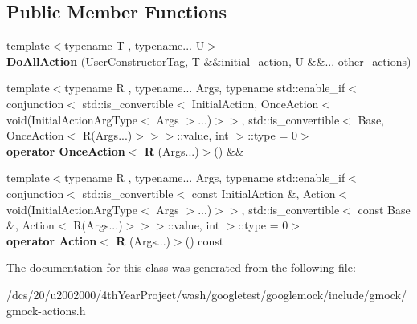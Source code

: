 \subsection*{Public Member Functions}
\begin{DoxyCompactItemize}
\item 
\mbox{\label{classtesting_1_1internal_1_1DoAllAction_3_01InitialAction_00_01OtherActions_8_8_8_01_4_a726288a771d93b49da88125f2499d067}} 
{\footnotesize template$<$typename T , typename... U$>$ }\\{\bfseries Do\+All\+Action} (User\+Constructor\+Tag, T \&\&initial\+\_\+action, U \&\&... other\+\_\+actions)
\item 
\mbox{\label{classtesting_1_1internal_1_1DoAllAction_3_01InitialAction_00_01OtherActions_8_8_8_01_4_a6809411684469fda88690fe29a3ca134}} 
{\footnotesize template$<$typename R , typename... Args, typename std\+::enable\+\_\+if$<$ conjunction$<$ std\+::is\+\_\+convertible$<$ Initial\+Action, Once\+Action$<$ void(\+Initial\+Action\+Arg\+Type$<$ Args $>$...)$>$$>$, std\+::is\+\_\+convertible$<$ Base, Once\+Action$<$ R(\+Args...)$>$$>$$>$\+::value, int $>$\+::type  = 0$>$ }\\{\bfseries operator Once\+Action$<$ R} (Args...)$>$() \&\&
\item 
\mbox{\label{classtesting_1_1internal_1_1DoAllAction_3_01InitialAction_00_01OtherActions_8_8_8_01_4_a2cad7d9ed5d90573d421833482b51744}} 
{\footnotesize template$<$typename R , typename... Args, typename std\+::enable\+\_\+if$<$ conjunction$<$ std\+::is\+\_\+convertible$<$ const Initial\+Action \&, Action$<$ void(\+Initial\+Action\+Arg\+Type$<$ Args $>$...)$>$$>$, std\+::is\+\_\+convertible$<$ const Base \&, Action$<$ R(\+Args...)$>$$>$$>$\+::value, int $>$\+::type  = 0$>$ }\\{\bfseries operator Action$<$ R} (Args...)$>$() const
\end{DoxyCompactItemize}


The documentation for this class was generated from the following file\+:\begin{DoxyCompactItemize}
\item 
/dcs/20/u2002000/4th\+Year\+Project/wash/googletest/googlemock/include/gmock/gmock-\/actions.\+h\end{DoxyCompactItemize}
